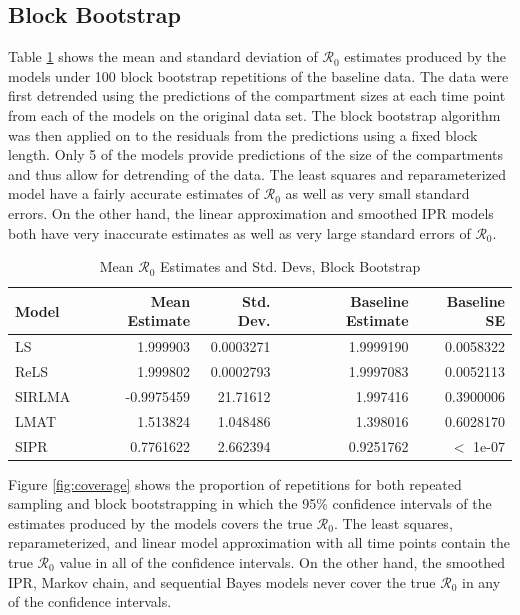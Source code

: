 \documentclass[12pt]{article}
\newcommand{\rr}{\ensuremath{\mathcal{R}_0}}
\begin{document}
\subsection{Block Bootstrap}

Table \ref{tab:bb-samp} shows the mean and standard deviation of $\rr$ estimates produced by the models under 100 block bootstrap repetitions of the baseline data. The data were first detrended using the predictions of the compartment sizes at each time point from each of the models on the original data set. The block bootstrap algorithm was then applied on to the residuals from the predictions using a fixed block length. Only 5 of the models provide predictions of the size of the compartments and thus allow for detrending of the data. The least squares and reparameterized model have a fairly accurate estimates of $\rr$ as well as very small standard errors. On the other hand, the linear approximation and smoothed IPR models both have very inaccurate estimates as well as very large standard errors of $\rr$.

\begin{table}[H]
	
	\centering
	\begin{tabular}[t]{l|r|r|r|r}
		\hline
		Model & Mean Estimate & Std. Dev. & Baseline Estimate & Baseline SE\\
		\hline
		LS & 1.999903 & 0.0003271 & 1.9999190 & 0.0058322\\
		\hline
		ReLS & 1.999802 & 0.0002793 & 1.9997083 & 0.0052113\\
		\hline
		SIRLMA & -0.9975459 & 21.71612 & 1.997416 & 0.3900006\\
		\hline
		LMAT & 1.513824 & 1.048486 & 1.398016 & 0.6028170 \\
		\hline
		SIPR & 0.7761622 & 2.662394 & 0.9251762 & $<$ 1e-07 \\
		\hline
	\end{tabular}
	\caption{Mean $\rr$ Estimates and Std. Devs, Block Bootstrap}
	\label{tab:bb-samp}
\end{table}

Figure \ref{fig:coverage} shows the proportion of repetitions for both repeated sampling and block bootstrapping in which the 95\% confidence intervals of the estimates produced by the models covers the true $\rr$. The least squares, reparameterized, and linear model approximation with all time points contain the true $\rr$ value in all of the confidence intervals. On the other hand, the smoothed IPR, Markov chain, and sequential Bayes models never cover the true $\rr$ in any of the confidence intervals.
\end{document}
